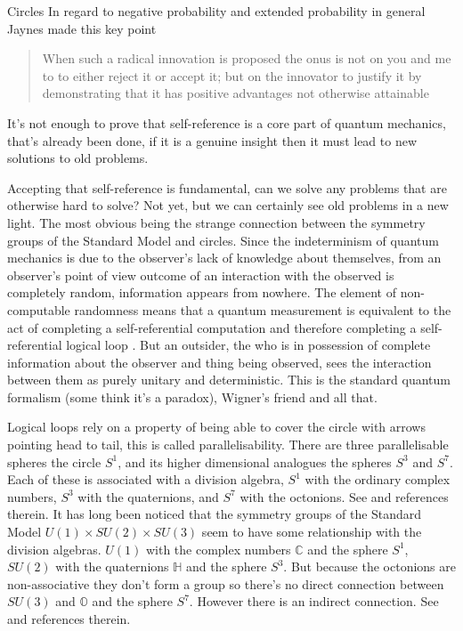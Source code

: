 \documentclass[final]{beamer}
\newlength{\colwidth}
\begin{document}
\begin{frame}[t]
\begin{columns}[t]
\begin{column}{\colwidth}
\begin{block}{Circles}
In regard to negative probability and extended probability in general Jaynes \autocite{muckenheim_1986}  made this key point 
\begin{quote}
    When such a radical innovation is proposed the onus is not on you and me to to either reject it or accept it; but on the innovator to justify it by demonstrating that it has positive advantages not otherwise attainable
\end{quote}
It's not enough to prove that self-reference is a core part of quantum mechanics, that's already been done, if it is a genuine insight then it must lead to new solutions to old problems.
\par
Accepting that self-reference is fundamental, can we solve any problems that are otherwise hard to solve? Not yet, but we can certainly see old problems in a new light. The most obvious being the strange connection between the symmetry groups of the Standard Model and circles. Since the indeterminism of quantum mechanics is due to the observer's lack of knowledge about themselves, from an observer's point of view outcome of an interaction with the observed is completely random, information appears  from nowhere. The element of non-computable randomness means that a quantum measurement is equivalent to the act of completing a self-referential computation and therefore completing a self-referential logical loop \autocite{calude_value_indefiniteness_2006, bendersky_non_computable_2016}.  But an outsider, the  who is in possession of complete information about the observer and thing being observed, sees the interaction between them as purely unitary and deterministic. This is the standard quantum formalism (some think it's a paradox), Wigner's friend and all that.   
\par 
Logical loops rely on a property of being able to cover the circle with arrows pointing head to tail, this is called parallelisability. There are three parallelisable spheres the circle $S^1$, and its higher dimensional analogues the spheres $S^3$ and $S^7$. Each of these is associated with a division algebra, $S^1$ with the ordinary complex numbers, $S^3$ with the quaternions, and $S^7$ with the octonions. See \autocite{baez_2002} and references therein. It has long been noticed that the symmetry groups of the Standard Model $U(1) \times SU(2) \times SU(3) $ seem to have some relationship with the division algebras. $U(1)$ with the complex numbers $\mathbb{C}$ and the sphere $S^1$, $SU(2)$ with the quaternions $\mathbb{H}$ and the sphere $S^3$. But because the octonions are non-associative they don't form a group so there's no direct connection between $SU(3)$ and $\mathbb{O}$ and the sphere $S^7$. However there is an indirect connection. See \autocite{baez_2002, dixon_G_94, Furey2018_fixed} and references therein. 

\end{block}
\end{column}
\end{columns}
\end{frame}
\end{document}
